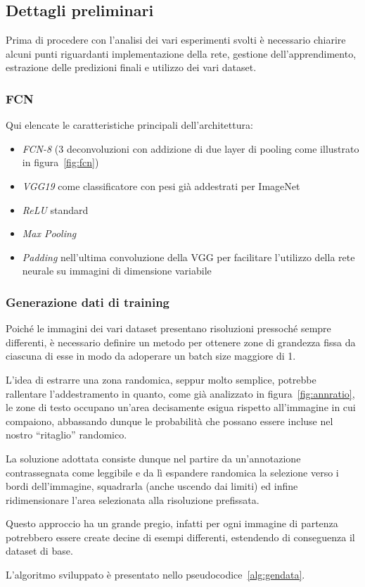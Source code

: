 \subsection{Dettagli preliminari}

Prima di procedere con l'analisi dei vari esperimenti svolti è necessario chiarire alcuni punti riguardanti implementazione della rete, gestione dell'apprendimento, estrazione delle predizioni finali e utilizzo dei vari dataset.\par

\subsubsection{FCN}
\label{subsec:impl}
Qui elencate le caratteristiche principali dell'architettura: 
\begin{itemize}
	\item \textit{FCN-8} (3 deconvoluzioni con addizione di due layer di pooling come illustrato in figura~\ref{fig:fcn})
	\item \textit{VGG19} come classificatore con pesi già addestrati per ImageNet~\cite{pretrained}
	\item \textit{ReLU} standard
	\item \textit{Max Pooling}
	\item \textit{Padding} nell'ultima convoluzione della VGG per facilitare l'utilizzo della rete neurale su immagini di dimensione variabile
\end{itemize}


\subsubsection{Generazione dati di training}
\label{subsubsec:gendata}
Poiché le immagini dei vari dataset presentano risoluzioni pressoché sempre differenti, è necessario definire un metodo per ottenere zone di grandezza fissa da ciascuna di esse in modo da adoperare un batch size maggiore di 1.\par
L'idea di estrarre una zona randomica, seppur molto semplice, potrebbe rallentare l'addestramento in quanto, come già analizzato in figura~\ref{fig:annratio}, le zone di testo occupano un'area decisamente esigua rispetto all'immagine in cui compaiono, abbassando dunque le probabilità che possano essere incluse nel nostro ``ritaglio'' randomico.\par
La soluzione adottata consiste dunque nel partire da un'annotazione contrassegnata come leggibile e da lì espandere randomica la selezione verso i bordi dell'immagine, squadrarla (anche uscendo dai limiti) ed infine ridimensionare l'area selezionata alla risoluzione prefissata.\par
Questo approccio ha un grande pregio, infatti per ogni immagine di partenza potrebbero essere create decine di esempi differenti, estendendo di conseguenza il dataset di base.\par
L'algoritmo sviluppato è presentato nello pseudocodice~\ref{alg:gendata}.


